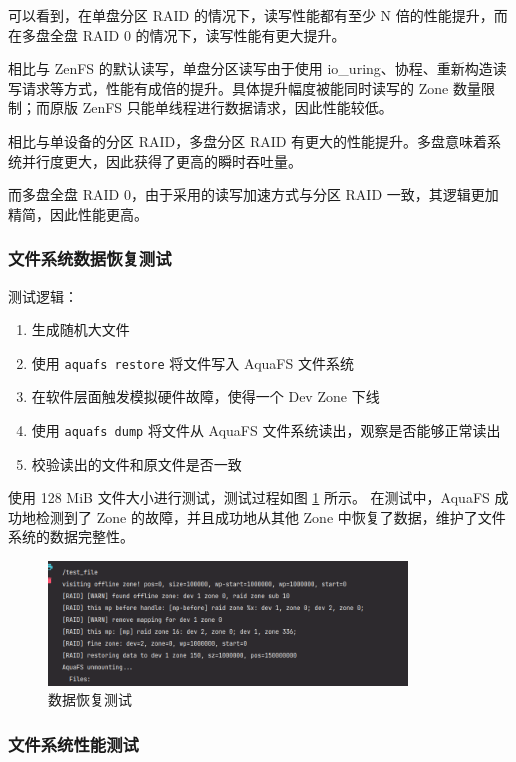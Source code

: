 可以看到，在单盘分区 RAID 的情况下，读写性能都有至少 N 倍的性能提升，而在多盘全盘 RAID 0 的情况下，读写性能有更大提升。

相比与 ZenFS 的默认读写，单盘分区读写由于使用 io\_uring、协程、重新构造读写请求等方式，性能有成倍的提升。具体提升幅度被能同时读写的 Zone 数量限制；而原版 ZenFS 只能单线程进行数据请求，因此性能较低。

相比与单设备的分区 RAID，多盘分区 RAID 有更大的性能提升。多盘意味着系统并行度更大，因此获得了更高的瞬时吞吐量。

而多盘全盘 RAID 0，由于采用的读写加速方式与分区 RAID 一致，其逻辑更加精简，因此性能更高。

\subsubsection{文件系统数据恢复测试}

测试逻辑：

\begin{enumerate}
  \item 生成随机大文件
  \item 使用 \verb|aquafs restore| 将文件写入 AquaFS 文件系统
  \item 在软件层面触发模拟硬件故障，使得一个 Dev Zone 下线
  \item 使用 \verb|aquafs dump| 将文件从 AquaFS 文件系统读出，观察是否能够正常读出
  \item 校验读出的文件和原文件是否一致
\end{enumerate}

使用 128 MiB 文件大小进行测试，测试过程如图 \ref{test-recovery} 所示。
在测试中，AquaFS 成功地检测到了 Zone 的故障，并且成功地从其他 Zone 中恢复了数据，维护了文件系统的数据完整性。

\begin{figure}[htbp]
  \centering
  \includegraphics[width=0.85\textwidth]{fig/test-recovery}
  \caption{ 数据恢复测试 }
  \label{test-recovery}
\end{figure}

\subsubsection{文件系统性能测试}

